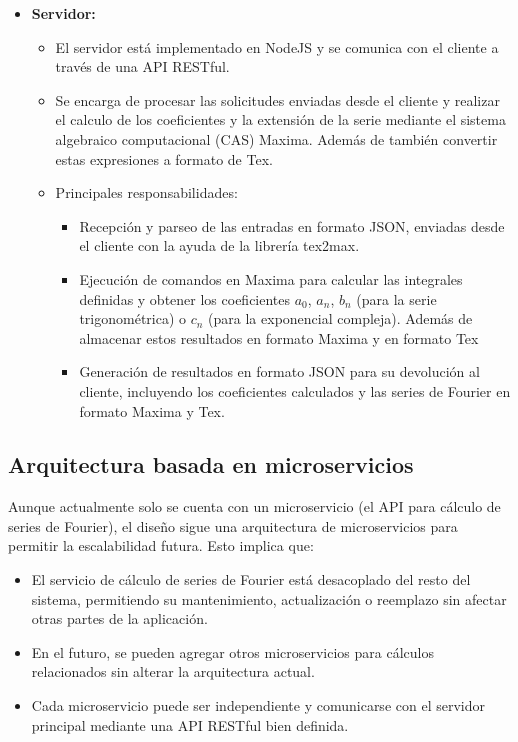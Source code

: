 \begin{itemize}
	\item \textbf{Servidor:}
	\begin{itemize}
		\item El servidor está implementado en NodeJS y se comunica con el cliente a través de una API RESTful.
		\item Se encarga de procesar las solicitudes enviadas desde el cliente y realizar  el calculo de los coeficientes y la extensión de la serie mediante el sistema algebraico computacional (CAS) Maxima. Además de también convertir estas expresiones a formato de Tex.
		\item Principales responsabilidades:
		\begin{itemize}
			\item Recepción y parseo de las entradas en formato JSON, enviadas desde el cliente con la ayuda de la librería tex2max.
			\item Ejecución de comandos en Maxima para calcular las integrales definidas y obtener los coeficientes \( a_0 \), \( a_n \), \( b_n \) (para la serie trigonométrica) o \( c_n \) (para la exponencial compleja). Además de almacenar estos resultados en formato Maxima y en formato Tex
			\item Generación de resultados en formato JSON para su devolución al cliente, incluyendo los coeficientes calculados y las series de Fourier en formato Maxima y Tex.
			
		\end{itemize}
	\end{itemize}
\end{itemize}
\subsection{Arquitectura basada en microservicios}
Aunque actualmente solo se cuenta con un microservicio (el API para cálculo de series de Fourier), el diseño sigue una arquitectura de microservicios para permitir la escalabilidad futura. Esto implica que:

\begin{itemize}
	\item El servicio de cálculo de series de Fourier está desacoplado del resto del sistema, permitiendo su mantenimiento, actualización o reemplazo sin afectar otras partes de la aplicación.
	\item En el futuro, se pueden agregar otros microservicios para cálculos relacionados sin alterar la arquitectura actual.
	\item Cada microservicio puede ser independiente y comunicarse con el servidor principal mediante una API RESTful bien definida.
\end{itemize}



